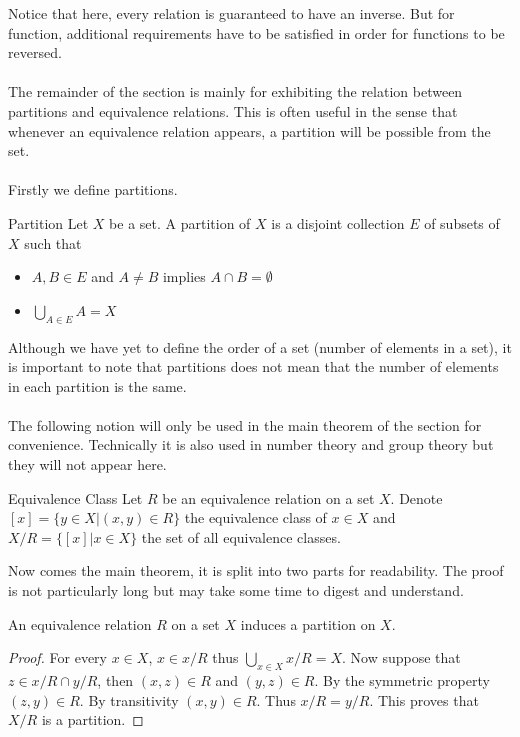 Notice that here, every relation is guaranteed to have an inverse. But for function, additional requirements have to be satisfied in order for functions to be reversed. \\~\\

The remainder of the section is mainly for exhibiting the relation between partitions and equivalence relations. This is often useful in the sense that whenever an equivalence relation appears, a partition will be possible from the set. \\~\\
Firstly we define partitions. 

\begin{defn}{Partition}{} Let $X$ be a set. A partition of $X$ is a disjoint collection $E$ of subsets of $X$ such that
\begin{itemize}
\item $A,B\in E$ and $A\neq B$ implies $A\cap B=\emptyset$
\item $\bigcup_{A\in E}A=X$
\end{itemize}
\end{defn}

Although we have yet to define the order of a set (number of elements in a set), it is important to note that partitions does not mean that the number of elements in each partition is the same. \\~\\

The following notion will only be used in the main theorem of the section for convenience. Technically it is also used in number theory and group theory but they will not appear here. 

\begin{defn}{Equivalence Class}{} Let $R$ be an equivalence relation on a set $X$. Denote $[x]=\{y\in X|(x,y)\in R\}$ the equivalence class of $x\in X$ and $X/R=\{[x]|x\in X\}$ the set of all equivalence classes. 
\end{defn}

Now comes the main theorem, it is split into two parts for readability. The proof is not particularly long but may take some time to digest and understand. 

\begin{thm}{}{} An equivalence relation $R$ on a set $X$ induces a partition on $X$. \tcbline
\begin{proof}
For every $x\in X$, $x\in x/R$ thus $\bigcup_{x\in X}x/R=X$. Now suppose that $z\in x/R\cap y/R$, then $(x,z)\in R$ and $(y,z)\in R$. By the symmetric property $(z,y)\in R$. By transitivity $(x,y)\in R$. Thus $x/R=y/R$. This proves that $X/R$ is a partition. 
\end{proof}
\end{thm}

